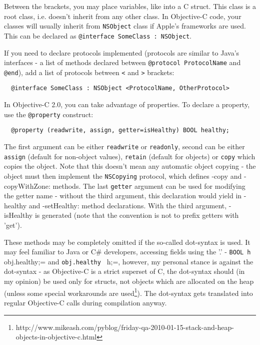 \documentclass[a4paper, 11pt, fleqn]{book}
\begin{document}
Between the { } brackets, you may place variables, like into a C struct. This class is a root class, i.e. doesn't inherit from any other class. In Objective-C code, your classes will usually inherit from \verb=NSObject= class if Apple's frameworks are used. This can be declared as \verb=@interface SomeClass : NSObject=.

If you need to declare protocols implemented (protocols are similar to Java's interfaces - a list of methods declared between \verb=@protocol ProtocolName= and \verb=@end=), add a list of protocols between \verb=<= and \verb=>= brackets:

\begin{verbatim}
  @interface SomeClass : NSObject <ProtocolName, OtherProtocol>
\end{verbatim}

In Objective-C 2.0, you can take advantage of properties. To declare a property, use the \verb=@property= construct:

\begin{verbatim}
  @property (readwrite, assign, getter=isHealthy) BOOL healthy;
\end{verbatim}

The first argument can be either \verb=readwrite= or \verb=readonly=, second can be either \verb=assign= (default for non-object values), \verb=retain= (default for objects) or \verb=copy= which copies the object. Note that this doesn't mean any automatic object copying - the object must then implement the \verb=NSCopying= protocol, which defines -copy and -copyWithZone: methods. The last \verb=getter= argument can be used for modifying the getter name - without the third argument, this declaration would yield in -healthy and -setHealthy: method declarations. With the third argument, -isHealthy is generated (note that the convention is not to prefix getters with 'get'). 

These methods may be completely omitted if the so-called dot-syntax is used. It may feel familiar to Java or C# developers, accessing fields using the '.' - \verb=BOOL h = obj.healthy;= and \verb=obj.healthy = h;=, however, my personal stance is against the dot-syntax - as Objective-C is a strict superset of C, the dot-syntax should (in my opinion) be used only for structs, not objects which are allocated on the heap (unless some special workarounds are used\footnote{http://www.mikeash.com/pyblog/friday-qa-2010-01-15-stack-and-heap-objects-in-objective-c.html}). The dot-syntax gets translated into regular Objective-C calls during compilation anyway.
\end{document}
